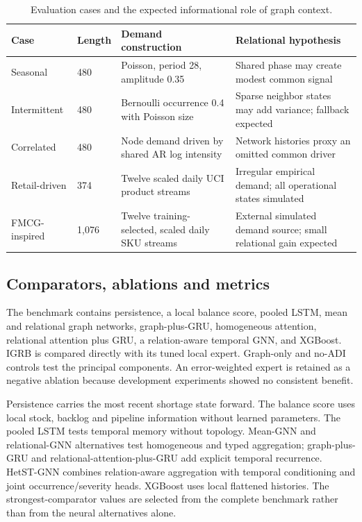\documentclass[11pt,a4paper]{article}
\begin{document}
\begin{table}[tb]\centering\small
\caption{Evaluation cases and the expected informational role of graph context.}\label{tab:cases}
\begin{tabularx}{\linewidth}{p{.17\linewidth}p{.16\linewidth}p{.25\linewidth}Y}\toprule
Case & Length & Demand construction & Relational hypothesis \\\midrule
Seasonal & 480 & Poisson, period 28, amplitude 0.35 & Shared phase may create modest common signal \\
Intermittent & 480 & Bernoulli occurrence 0.4 with Poisson size & Sparse neighbor states may add variance; fallback expected \\
Correlated & 480 & Node demand driven by shared AR log intensity & Network histories proxy an omitted common driver \\
Retail-driven & 374 & Twelve scaled daily UCI product streams & Irregular empirical demand; all operational states simulated \\
FMCG-inspired & 1,076 & Twelve training-selected, scaled daily SKU streams & External simulated demand source; small relational gain expected \\
\bottomrule\end{tabularx}
\end{table}

\subsection{Comparators, ablations and metrics}
The benchmark contains persistence, a local balance score, pooled LSTM, mean and relational graph networks, graph-plus-GRU, homogeneous attention, relational attention plus GRU, a relation-aware temporal GNN, and XGBoost. IGRB is compared directly with its tuned local expert. Graph-only and no-ADI controls test the principal components. An error-weighted expert is retained as a negative ablation because development experiments showed no consistent benefit.

Persistence carries the most recent shortage state forward. The balance score uses local stock, backlog and pipeline information without learned parameters. The pooled LSTM tests temporal memory without topology. Mean-GNN and relational-GNN alternatives test homogeneous and typed aggregation; graph-plus-GRU and relational-attention-plus-GRU add explicit temporal recurrence. HetST-GNN combines relation-aware aggregation with temporal conditioning and joint occurrence/severity heads. XGBoost uses local flattened histories. The strongest-comparator values are selected from the complete benchmark rather than from the neural alternatives alone.
\end{document}
